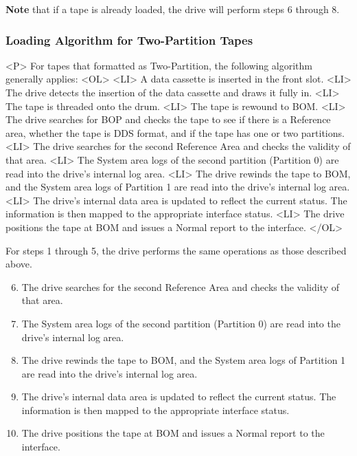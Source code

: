 {\bf Note} that if a tape is already loaded, the drive will perform steps
6 through 8.

\subsubsection {Loading Algorithm for Two-Partition Tapes}

\begin{htmlonly}
\begin{rawhtml}
<P>
For tapes that formatted as Two-Partition, the following algorithm generally
applies:
<OL>
<LI> A data cassette is inserted in the front slot.
<LI> The drive detects the insertion of the data cassette and draws it
fully in.
<LI> The tape is threaded onto the drum.
<LI> The tape is rewound to BOM.
<LI> The drive searches for BOP and checks the tape to see if there is a
Reference area, whether the tape is DDS format, and if the tape has one or
two partitions.
<LI> The drive searches for the second Reference Area and checks the
validity of that area.
<LI> The System area logs of the second partition (Partition 0) are read
into the drive's internal log area.
<LI> The drive rewinds the tape to BOM, and the System area logs of
Partition 1 are read into the drive's internal log area.
<LI> The drive's internal data area is updated to reflect the current
status. The information is then mapped to the appropriate interface status.
<LI> The drive positions the tape at BOM and issues a Normal report to the
interface.
</OL>
\end{rawhtml}
\end{htmlonly}

\begin {latexonly}

For steps 1 through 5, the drive performs the same operations as those
described above.

\begin {enumerate}

\setcounter {enumi}{5}

\item The drive searches for the second Reference Area and checks the
validity of that area.

\item The System area logs of the second partition (Partition 0) are read
into the drive's internal log area.

\item The drive rewinds the tape to BOM, and the System area logs of
Partition 1 are read into the drive's internal log area.

\item The drive's internal data area is updated to reflect the current
status. The information is then mapped to the appropriate interface status.

\item The drive positions the tape at BOM and issues a Normal report to the
interface.

\end {enumerate}

\end {latexonly}

